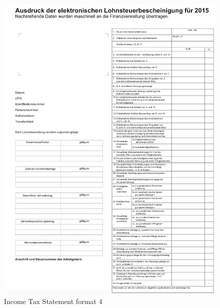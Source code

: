 \begin{figure}[H]
\centering
\includegraphics[scale=0.6]{images/LS-Formats/ls-format-4.png}
\caption{Income Tax Statement format 4}
\label{ls_format2}
\end{figure}
